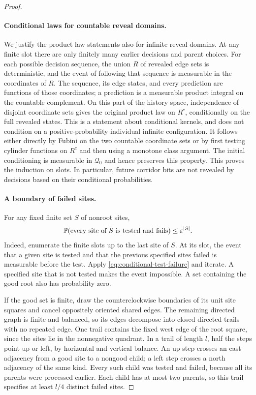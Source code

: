 \begin{proof}
\paragraph{Conditional laws for countable reveal domains.}
We justify the product-law statements also for infinite reveal
domains. At any finite slot there are only finitely many earlier
decisions and parent choices. For each possible decision sequence,
the union $R$ of revealed edge sets is deterministic, and the event
of following that sequence is measurable in the coordinates of $R$.
The sequence, its edge states, and every prediction are functions
of those coordinates; a prediction is a measurable product integral
on the countable complement. On this part of the history space,
independence of disjoint coordinate sets gives the original product
law on $R^c$, conditionally on the full revealed states. This is a
statement about conditional kernels, and does not condition on a
positive-probability individual infinite configuration. It follows
either directly by Fubini on the two countable coordinate sets or by
first testing cylinder functions on $R^c$ and then using a monotone
class argument. The initial conditioning is measurable in
$\mathcal Q_0$ and hence preserves this property. This proves the
induction on slots. In particular, future corridor bits are not
revealed by decisions based on their conditional probabilities.

\paragraph{A boundary of failed sites.}
For any fixed finite set $S$ of nonroot sites,
\begin{equation}\label{eq:specified-failures}
 \mathbb P(\text{every site of }S\text{ is tested and fails})
       \le\varepsilon^{|S|}.
\end{equation}
Indeed, enumerate the finite slots up to the last site of $S$.
At its slot, the event that a given site is tested and that the
previous specified sites failed is measurable before the test.
Apply \eqref{eq:conditional-test-failure} and iterate. A specified
site that is not tested makes the event impossible. A set containing
the good root also has probability zero.

If the good set is finite, draw the counterclockwise boundaries of
its unit site squares and cancel oppositely oriented shared edges.
The remaining directed graph is finite and balanced, so its edges
decompose into closed directed trails with no repeated edge. One
trail contains the fixed west edge of the root square, since the
sites lie in the nonnegative quadrant. In a trail of length $l$,
half the steps point up or left, by horizontal and vertical balance.
An up step crosses an east adjacency from a good site to a nongood
child; a left step crosses a north adjacency of the same kind.
Every such child was tested and failed, because all its parents were
processed earlier. Each child has at most two parents, so this trail
specifies at least $l/4$ distinct failed sites.


\end{proof}
